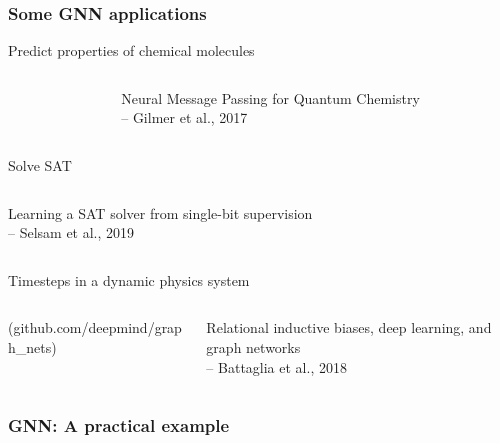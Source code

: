 \documentclass{beamer}
\begin{document}
\begin{frame}
\frametitle{Some GNN applications}
\begin{block}{Predict properties of chemical molecules}
\begin{columns}[t]
\begin{column}{.4\textwidth}
\centering {}
\end{column}
\begin{column}{.6\textwidth}
\centering \footnotesize Neural Message Passing for Quantum Chemistry\\
\centering -- Gilmer et al., 2017
\end{column}
\end{columns}
\end{block}

\begin{block}{Solve SAT}
\begin{columns}[t]
\begin{column}{.4\textwidth}
\centering \footnotesize Learning a SAT solver from single-bit supervision \\
\centering-- Selsam et al., 2019
\end{column}
\begin{column}{.6\textwidth}
\end{column}
\end{columns}
\end{block}

\begin{block}{Timesteps in a dynamic physics system}
\begin{columns}[t]
\begin{column}{.5\textwidth}
\centering {}
\centering \footnotesize (github.com/deepmind/graph\_nets)
\end{column}
\begin{column}{.5\textwidth}
\footnotesize Relational inductive biases, deep learning, and graph networks \\
 \centering-- Battaglia et al., 2018
\end{column}
\end{columns}
\end{block}

\end{frame}



\begin{frame}
\frametitle{GNN: A practical example}

\end{frame}
\end{document}
